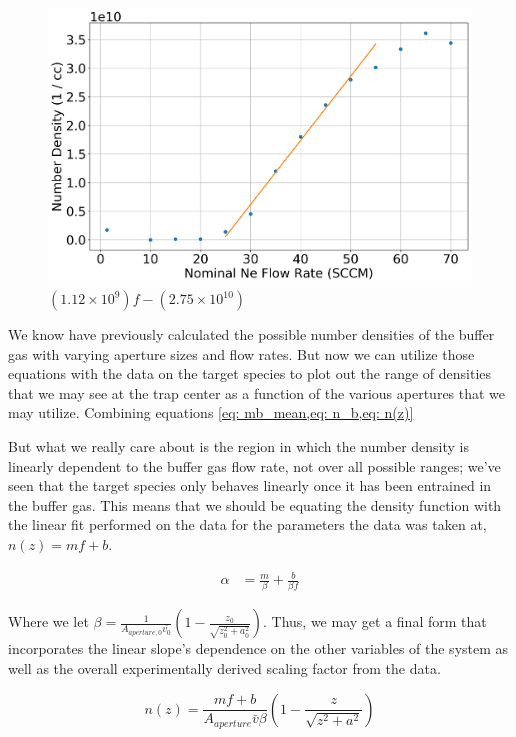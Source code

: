 \begin{figure}[H]
	\centering
	\includegraphics[width=1\textwidth]{images/CBGB_hydrodynamic_fit.png}
	\caption{$(1.12 \times 10^9) f - (2.75 \times 10^10)$}
	\label{fig: rga}
\end{figure}

We know have previously calculated the possible number densities of the buffer gas with varying aperture sizes and flow rates. But now we can utilize those equations with the data on the target species to plot out the range of densities that we may see at the trap center as a function of the various apertures that we may utilize. Combining equations \cref{eq: mb_mean,eq: n_b,eq: n(z)}

But what we really care about is the region in which the number density is linearly dependent to the buffer gas flow rate, not over all possible ranges; we've seen that the target species only behaves linearly once it has been entrained in the buffer gas. This means that we should be equating the density function with the linear fit performed on the data for the parameters the data was taken at, $n(z)=mf+b$.

\begin{align*}
	\alpha & = \frac{m}{\beta}+\frac{b}{\beta f}
\end{align*}

Where we let $\beta = \frac{1}{A_{aperture, 0} \bar{v_0}}\left(1-\frac{z_0}{\sqrt{z_0^2+a_0^2}}\right)$. Thus, we may get a final form that incorporates the linear slope's dependence on the other variables of the system as well as the overall experimentally derived scaling factor from the data.

\begin{equation*}
	n(z) = \frac{mf+b}{A_{aperture} \bar{v} \beta}\left(1-\frac{z}{\sqrt{z^2+a^2}}\right)
\end{equation*}

